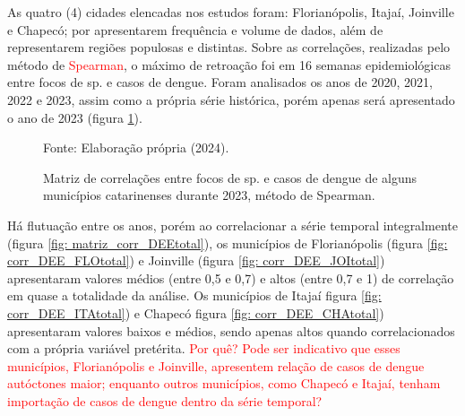 \documentclass[
	12pt,				%
	openright,			%
	oneside,			%
	a4paper,			%
	english,			%
	french,				%
	spanish,			%
	brazil				%
	dvipsnames, table]{abntex2}
\begin{document}
\indent As quatro (4) cidades elencadas nos estudos foram: Florianópolis, Itajaí, Joinville e Chapecó; por apresentarem frequência e volume de dados, além de representarem regiões populosas e distintas. Sobre as correlações, realizadas pelo método de \textcolor{red}{Spearman}, o máximo de retroação foi em 16 semanas epidemiológicas entre focos de  sp. e casos de dengue. Foram analisados os anos de 2020, 2021, 2022 e 2023, assim como a própria série histórica, porém apenas será apresentado o ano de 2023 (figura \ref{fig: matriz_corr_DEE}).

\begin{figure}[htbp]
    \centering
    \caption{Matriz de correlações entre focos de  sp. e casos de dengue de alguns municípios catarinenses durante 2023, método de Spearman.}
    \label{fig: matriz_corr_DEE}
    \hfill
    \hfill
    \small{Fonte: Elaboração própria (2024).}
\end{figure}

Há flutuação entre os anos, porém ao correlacionar a série temporal integralmente (figura \ref{fig: matriz_corr_DEEtotal}), os municípios de Florianópolis (figura \ref{fig: corr_DEE_FLOtotal}) e Joinville (figura \ref{fig: corr_DEE_JOItotal}) apresentaram valores médios (entre 0,5 e 0,7) e altos (entre 0,7 e 1) de correlação em quase a totalidade da análise. Os municípios de Itajaí figura \ref{fig: corr_DEE_ITAtotal}) e Chapecó figura \ref{fig: corr_DEE_CHAtotal}) apresentaram valores baixos e médios, sendo apenas altos quando correlacionados com a própria variável pretérita.  \textcolor{red}{Por quê? Pode ser indicativo que esses municípios, Florianópolis e Joinville, apresentem relação de casos de dengue autóctones maior; enquanto outros municípios, como Chapecó e Itajaí, tenham importação de casos de dengue dentro da série temporal?}
\end{document}
